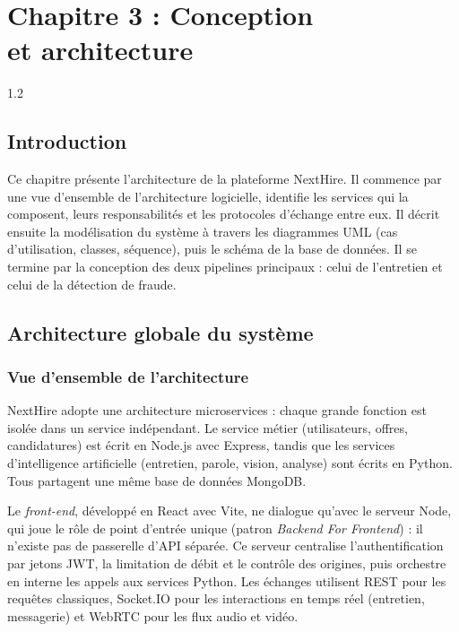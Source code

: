 \chapter[Chapitre 3 : Conception et architecture]{Chapitre 3 : Conception\\et architecture}
\begin{spacing}{1.2}
\minitoc
\thispagestyle{MyStyle}
\end{spacing}
\clearpage

\section{Introduction}

Ce chapitre présente l'architecture de la plateforme NextHire. Il commence par une vue d'ensemble de l'architecture logicielle, identifie les services qui la composent, leurs responsabilités et les protocoles d'échange entre eux. Il décrit ensuite la modélisation du système à travers les diagrammes UML (cas d'utilisation, classes, séquence), puis le schéma de la base de données. Il se termine par la conception des deux pipelines principaux : celui de l'entretien et celui de la détection de fraude.

\section{Architecture globale du système}

\subsection{Vue d'ensemble de l'architecture}

NextHire adopte une architecture microservices : chaque grande fonction est isolée dans un service indépendant. Le service métier (utilisateurs, offres, candidatures) est écrit en Node.js avec Express, tandis que les services d'intelligence artificielle (entretien, parole, vision, analyse) sont écrits en Python. Tous partagent une même base de données MongoDB.

Le \textit{front-end}, développé en React avec Vite, ne dialogue qu'avec le serveur Node, qui joue le rôle de point d'entrée unique (patron \textit{Backend For Frontend}) : il n'existe pas de passerelle d'API séparée. Ce serveur centralise l'authentification par jetons JWT, la limitation de débit et le contrôle des origines, puis orchestre en interne les appels aux services Python. Les échanges utilisent REST pour les requêtes classiques, Socket.IO pour les interactions en temps réel (entretien, messagerie) et WebRTC pour les flux audio et vidéo.

